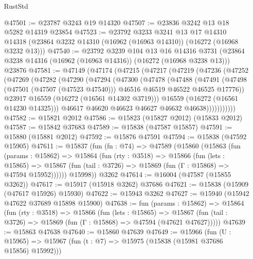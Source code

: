 \begin{lexlean}{RustStd}
\begin{coremodule}
@47501 := @23787 @3243 @19 @14320
@47507 := @23836 @3242 @13 @18 @5282 @14319 @23854
@47523 := @23792
    @3233
    @3241
    @13
    @17
    @14310
    @14318
    (@23864 @3232 @14310 (@16962 (@16963 @14310)) (@16272 (@16968 @3232 @13)))
@47540 := @23792
    @3239
    @104
    @13
    @16
    @14316
    @3731
    (@23864 @3238 @14316 (@16962 (@16963 @14316)) (@16272 (@16968 @3238 @13)))
    @23876
@47581 := @47149
    (@47174
      (@47215
        (@47217
          (@47219
            (@47236
              (@47252
                (@47269
                  (@47282
                    (@47290
                      (@47294
                        (@47300
                          (@47478
                            (@47488
                              (@47491
                                (@47498
                                  (@47501 (@47507 (@47523 @47540)))
                                  @46516
                                  @46519
                                  @46522
                                  @46525
                                  @17776))
                              @23917
                              @16559
                              (@16272 (@16561 @14302 @3719)))
                            @16559
                            (@16272 (@16561 @14230 @14325)))
                          @46617
                          @46620
                          @46623
                          @46627
                          @46632
                          @46638)))))))))))
@47582 := @15821 @2012
@47586 := @15823 (@15827 @2012) (@15833 @2012)
@47587 := @15842 @37683
@47589 := @15838 (@47587 @15857)
@47591 := @15880 (@15881 @2012)
@47592 := @15876 @47591
@47594 := @15838 (@47592 @15905)
@47611 := @15837
    (fun (fn : @74) =>
    @47589
      (@15860
        (@15863
          (fun (params : @15862) =>
          @15864
            (fun (rty : @3518) =>
            @15866
              (fun (lets : @15865) =>
              @15867 (fun (tail : @3726) => @15869 (fun (Γ : @15868) => @47594 @15952))))))
        @15998))
    @3262
@47614 := @16004 (@47587 (@15855 @3262))
@47617 := @15917 (@15918 @3262) @37686
@47621 := @15838 (@15909 (@47617 @15926) @15930)
@47622 := @15943 @3262
@47627 := @15940 (@15942 @47622 @37689 @15898 @15900)
@47638 := fun (params : @15862) =>
  @15864
    (fun (rty : @3518) =>
    @15866
      (fun (lets : @15865) =>
      @15867 (fun (tail : @3726) => @15869 (fun (Γ : @15868) => @47594 (@47621 @47627)))))
@47639 := @15863 @47638
@47640 := @15860 @47639
@47649 := @15966
    (fun (U : @15965) => @15967 (fun (t : @7) => @15975 (@15838 (@15981 @37686 @15856) @15992)))

\end{coremodule}
\end{lexlean}
